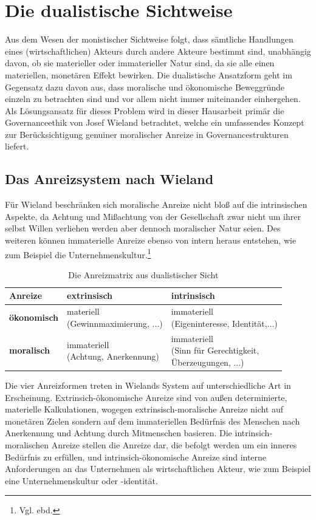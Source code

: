 \documentclass[12pt]{article}
\begin{document}
\section{Die dualistische Sichtweise}
Aus dem Wesen der monistischer Sichtweise folgt, dass sämtliche Handlungen eines (wirtschaftlichen) Akteurs durch andere Akteure bestimmt sind, unabhängig davon, ob sie materieller oder immaterieller Natur sind, da sie alle einen materiellen, monetären Effekt bewirken. Die dualistische Ansatzform geht im Gegensatz dazu davon aus, dass moralische und ökonomische Beweggründe einzeln zu betrachten sind und vor allem nicht immer miteinander einhergehen. Als Lösungsansatz für dieses Problem wird in dieser Hausarbeit primär die Governanceethik von Josef Wieland betrachtet, welche ein umfassendes Konzept zur Berücksichtigung genuiner moralischer Anreize in Governancestrukturen liefert.
\subsection{Das Anreizsystem nach Wieland}
Für Wieland beschränken sich moralische Anreize nicht bloß auf die intrinsischen Aspekte, da Achtung und Mißachtung von der Gesellschaft zwar nicht um ihrer selbst Willen verliehen werden aber dennoch moralischer Natur seien. Des weiteren können immaterielle Anreize ebenso von intern heraus entstehen, wie zum Beispiel die Unternehmenskultur.\footnote{Vgl. ebd.}
\FloatBarrier
\begin{table}[ht!]
\begin{tabular}{|p{3cm}|p{5cm}|p{5cm}|}
\hline
Anreize & \textbf{extrinsisch} & \textbf{intrinsisch}\\\hline
\textbf{ökonomisch} & \makecell[lt]{materiell\\(Gewinnmaximierung, ...)} & \makecell[lt]{immateriell\\ (Eigeninteresse, Identität,...)}\\\hline
\textbf{moralisch} & \makecell[lt]{immateriell\\(Achtung, Anerkennung)} & \makecell[lt]{immateriell\\(Sinn für Gerechtigkeit,\\Überzeugungen, ...)}\\\hline
\end{tabular}
\caption{Die Anreizmatrix aus dualistischer Sicht}
\end{table}
\FloatBarrier
\noindent Die vier Anreizformen treten in Wielands System auf unterschiedliche Art in Erscheinung. Extrinsich-ökonomische Anreize sind von außen determinierte, materielle Kalkulationen, wogegen extrinsisch-moralische Anreize nicht auf monetären Zielen sondern auf dem immateriellen Bedürfnis des Menschen nach Anerkennung und Achtung durch Mitmenschen basieren. Die intrinsich-moralischen Anreize stellen die Anreize dar, die befolgt werden um ein inneres Bedürfnis zu erfüllen, und intrinsich-ökonomische Anreize sind interne Anforderungen an das Unternehmen als wirtschaftlichen Akteur, wie zum Beispiel eine Unternehmenskultur oder -identität.
\end{document}
